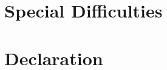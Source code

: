 \documentclass[12pt,a4paper,twoside,openright]{report}
\begin{document}
\section*{Special Difficulties}

\newpage

\section*{Declaration}


\tableofcontents


\listoffigures


\listoftables












\end{document}

